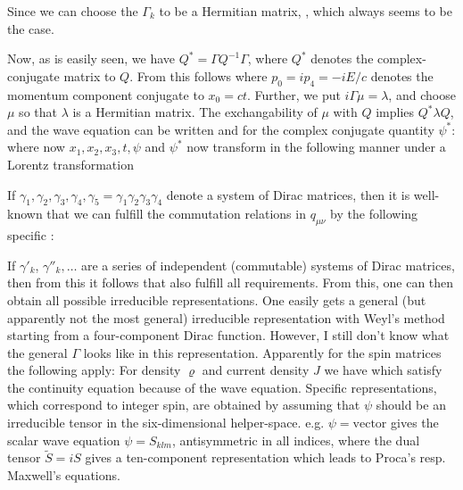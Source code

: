 Since we can choose the $\Gamma_k$  to be a Hermitian matrix, , which always seems to be the case.

Now, as is easily seen, we have $Q^*=\Gamma Q^{-1}\Gamma$, where $Q^*$ denotes the complex-conjugate matrix to $Q$. From this follows
where $p_0=ip_4=-iE/c$ denotes the momentum component conjugate to $x_0=ct$. Further, we put $i\Gamma\mu=\lambda$, and choose $\mu$ so that $\lambda$ is a Hermitian matrix. The exchangability of $\mu$ with $Q$ implies $Q^*\lambda Q$, and the wave equation can be written
and for the complex conjugate quantity $\psi^*$:
where now $x_1,x_2,x_3,t,\psi$ and $\psi^*$ now transform in the following manner under a Lorentz transformation

If $\gamma_1, \gamma_2, \gamma_3, \gamma_4, \gamma_5=\gamma_1\gamma_2\gamma_3\gamma_4$ denote a system of Dirac matrices, then it is well-known that we can fulfill the commutation relations in $q_{\mu\nu}$ by the following specific :

If $\gamma'_k$, $\gamma''_k, \dots$ are a series of independent (commutable) systems of Dirac matrices, then from this it follows that
also fulfill all requirements. From this, one can then obtain all possible irreducible representations. One easily gets a general (but apparently not the most general) irreducible representation with Weyl's method starting from a four-component Dirac function. However, I still don't know what the general $\Gamma$ looks like in this representation. Apparently for the spin matrices the following apply:
For density $\varrho$ and current density $J$ we have
which satisfy the continuity equation because of the wave equation. Specific representations, which correspond to integer spin, are obtained by assuming that $\psi$ should be an irreducible tensor in the six-dimensional helper-space. e.g. $\psi = \text{vector}$ gives the scalar wave equation $\psi=S_{klm}$, antisymmetric in all indices, where the dual tensor $\widetilde{S} = iS$ gives a ten-component representation which leads to Proca's resp. Maxwell's equations.

